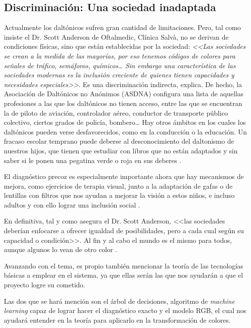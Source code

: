 \documentclass[10pt]{article}
\begin{document}
\newpage 

\subsection{Discriminación: Una sociedad inadaptada}

Actualmente los daltónicos sufren gran cantidad de limitaciones. Pero, tal como insiste el Dr. Scott Anderson de Oftalmedic, Clínica Salvà, no se derivan de condiciones físicas, sino que están establecidas por la sociedad: \textit{<<Las sociedades se crean a la medida de las mayorías, por eso tenemos códigos de colores para señales de tráfico, semáforos, químicos… Sin embargo una característica de las sociedades modernas es la inclusión creciente de quienes tienen capacidades y necesidades especiales>>}. Es una discriminación indirecta, explica. De hecho, la Asociación de Daltónicos no Anónimos (ASDNA) configura una lista de aquellas profesiones a las que los daltónicos no tienen acceso, entre las que se encuentran la de piloto de aviación, controlador aéreo, conductor de transporte público colectivo, ciertos grados de policía, bombero…
Hay otros ámbitos en los cuales los daltónicos pueden verse desfavorecidos, como en la conducción o la educación. Un fracaso escolar temprano puede deberse al desconocimiento del daltonismo de nuestros hijos, que tienen que estudiar con libros que no están adaptados y sin saber si le ponen una pegatina verde o roja en sus deberes \cite{IEEEreferencias:Ref33}.

El diagnóstico precoz es especialmente importante ahora que hay mecanismos de mejora, como ejercicios de terapia visual, junto a la adaptación de gafas o de lentillas con filtros que nos ayudan a mejorar la visión a estos niños, e incluso adultos y con ello lograr una inclusión social \cite{IEEEreferencias:Ref26}.

En definitiva, tal y como asegura el Dr. Scott Anderson, <<las sociedades deberían enfocarse a ofrecer igualdad de posibilidades, pero a cada cual según su capacidad o condición>>. Al fin y al cabo el mundo es el mismo para todos, aunque algunos lo vean de otro color \cite{IEEEreferencias:Ref33}.

Avanzando con el tema, es propio también mencionar la teoría de las tecnologías básicas a emplear en el sistema, ya que ellas serán las que nos ayudarán a que el proyecto logre su cometido.

Las dos que se hará mención son el árbol de decisiones, algoritmo de \textit{machine learning} capaz de lograr hacer el diagnóstico exacto y el modelo RGB, el cual nos ayudará entender en la teoría para aplicarlo en la transformación de colores. 
\end{document}
